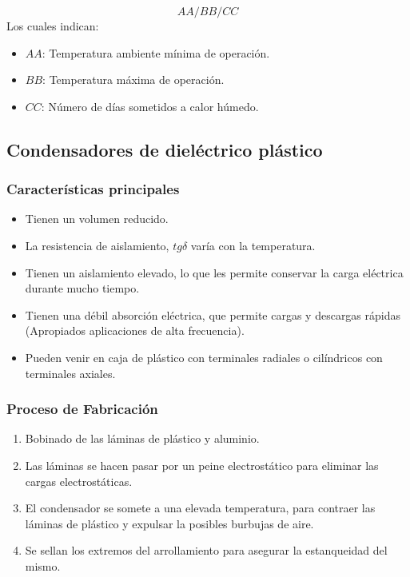 \begin{itemize}
    \begin{equation}
        AA / BB / CC
    \end{equation}
    Los cuales indican:
    \begin{itemize}
        \item $AA$: Temperatura ambiente mínima de operación.
        \item $BB$: Temperatura máxima de operación.
        \item $CC$: Número de días sometidos a calor húmedo.
    \end{itemize}
\end{itemize}

\subsection{Condensadores de dieléctrico plástico}

\subsubsection{Características principales}

\begin{itemize}
    \item Tienen un volumen reducido.
    \item La resistencia de aislamiento, $tg \delta$ varía con la temperatura.
    \item Tienen un aislamiento elevado, lo que les permite conservar la carga eléctrica durante mucho tiempo.
    \item Tienen una débil absorción eléctrica, que permite cargas y descargas rápidas (Apropiados aplicaciones de alta frecuencia).
    \item Pueden venir en caja de plástico con terminales radiales o cilíndricos con terminales axiales.
\end{itemize}

\subsubsection{Proceso de Fabricación}
\begin{enumerate}
    \item Bobinado de las láminas de plástico y aluminio.
    \item Las láminas se hacen pasar por un peine electrostático para eliminar las cargas electrostáticas.
    \item El condensador se somete a una elevada temperatura, para contraer las láminas de plástico y expulsar la posibles burbujas de aire.
    \item Se sellan los extremos del arrollamiento para asegurar la estanqueidad del mismo.
\end{enumerate}

